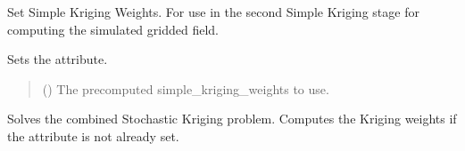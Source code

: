 \documentclass[letterpaper,10pt,english]{sphinxmanual}
\begin{document}
\begin{fulllineitems}
\begin{fulllineitems}
\begin{quote}
\begin{description}
\sphinxAtStartPar
{}

\end{description}\end{quote}

\end{fulllineitems}


\begin{fulllineitems}
\label{\detokenize{kriging:glomar_gridding.stochastic.StochasticKriging.set_simple_kriging_weights}}
\pysigstartsignatures
\pysiglinewithargsret
{}
{}
{}
\pysigstopsignatures
\sphinxAtStartPar
Set Simple Kriging Weights. For use in the second Simple Kriging stage
for computing the simulated gridded field.

\sphinxAtStartPar
Sets the  attribute.
\begin{quote}\begin{description}
\sphinxAtStartPar
{} () \textendash{} The pre\sphinxhyphen{}computed simple\_kriging\_weights to use.

\sphinxAtStartPar
{}

\end{description}\end{quote}

\end{fulllineitems}


\begin{fulllineitems}
\label{\detokenize{kriging:glomar_gridding.stochastic.StochasticKriging.solve}}
\pysigstartsignatures
\pysiglinewithargsret
{}
{}
{}
\pysigstopsignatures
\sphinxAtStartPar
Solves the combined Stochastic Kriging problem. Computes the Kriging
weights if the  attribute is not already set.


\end{fulllineitems}
\end{fulllineitems}
\end{document}
